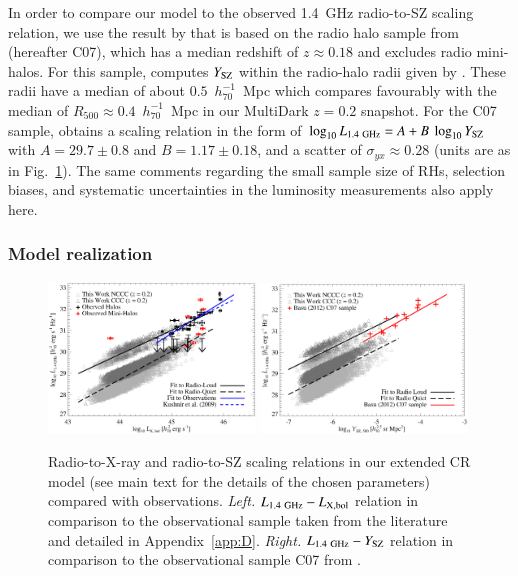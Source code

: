 \documentclass[useAMS,usenatbib]{mn2e}
\begin{document}
In order to compare our model to the observed 1.4~GHz radio-to-SZ scaling
relation, we use the result by \cite{2012MNRAS.421L.112B} that is based on the
radio halo sample from \cite{2007MNRAS.378.1565C} (hereafter C07), which has a
median redshift of $z \approx 0.18$ and excludes radio mini-halos. For this
sample, \cite{2012MNRAS.421L.112B} computes $Y_{{\mathrm{SZ}}}$ within the radio-halo
radii given by \cite{2007MNRAS.378.1565C}. These radii have a median of about
$0.5$~$h_{70}^{-1}$~Mpc which compares favourably with the median of $R_{500}
\approx 0.4$~$h_{70}^{-1}$~Mpc in our MultiDark $z = 0.2$ snapshot. For the C07
sample, \cite{2012MNRAS.421L.112B} obtains a scaling relation in the form of
$\log_{10} L_{1.4~{\mathrm{GHz}}} = A + B~\log_{10} Y_{{\mathrm{SZ}}}$ with $A=29.7\pm0.8$
and $B=1.17\pm0.18$, and a scatter of $\sigma_{yx} \approx 0.28$ (units are as
in Fig.~\ref{fig:PLSZ}). The same comments regarding the small sample size of
RHs, selection biases, and systematic uncertainties in the luminosity
measurements also apply here.


\subsubsection{Model realization}

\begin{figure} 
\centering
\includegraphics[width=0.49\textwidth]{figures/PL_relation.eps}
\includegraphics[width=0.49\textwidth]{figures/PSZ_relation.eps}
\caption{Radio-to-X-ray and radio-to-SZ scaling relations in our extended CR model
  (see main text for the details of the chosen parameters) compared with
  observations.  \emph{Left.} $L_{1.4~{\mathrm{GHz}}}-L_{{\mathrm{X,bol}}}$ relation in
  comparison to the observational sample taken from the literature and detailed
  in Appendix~\ref{app:D}. \emph{Right.} $L_{1.4~{\mathrm{GHz}}}-Y_{{\mathrm{SZ}}}$
  relation in comparison to the observational sample C07 from
  \protect\cite{2012MNRAS.421L.112B}.}
\label{fig:PLSZ}
\end{figure} 
\end{document}
